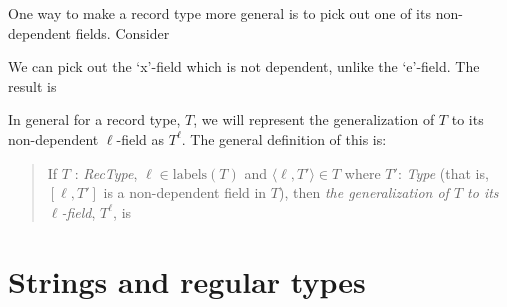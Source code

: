 One way to make a record type more general is to pick out one of its
non-dependent fields.  Consider 
\begin{quote}
\end{quote}
We can pick out the `x'-field which is not dependent, unlike the
`e'-field. The result is
\begin{quote}
\end{quote}
In general for a record type,  $T$, we will represent the generalization
of $T$ to its non-dependent $\ell$-field as $T^\ell$.  The general
definition of this is:
\begin{quote}
If $T$ : \textit{RecType}, $\ell\in\text{labels}(T)$ and
$\langle\ell,T'\rangle\in T$ where $T'$: \textit{Type} (that is,
$[\ell,T']$ is a non-dependent field in $T$), then \textit{the
  generalization of $T$ to its $\ell$-field}, $T^\ell$, is
\begin{quote}
\end{quote}
\end{quote}

\section{Strings and regular types}
\label{sec:regular}
\label{app:strings}

 
 

 


